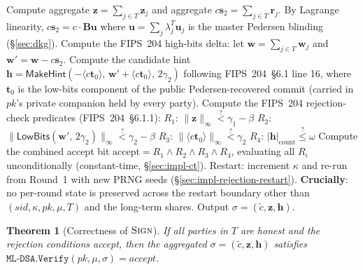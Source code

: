 \documentclass[11pt,a4paper]{article}
\newtheorem{theorem}{Theorem}
\theoremstyle{definition}
\theoremstyle{remark}
\newcommand{\LowBits}{\mathsf{LowBits}}
\newcommand{\MakeHint}{\mathsf{MakeHint}}
\newcommand{\Sign}{\textsc{Sign}}
\begin{document}
\begin{algorithm}[H]
\caption{$\Sign$ Aggregation and rejection (any honest party in $T$)}
\label{alg:sign-agg}
\begin{algorithmic}[1]
\State Compute aggregate $\mathbf{z} = \sum_{j \in T} \mathbf{z}_j$ and aggregate $c\mathbf{s}_2 = \sum_{j \in T} \mathbf{r}_j$. By Lagrange linearity, $c\mathbf{s}_2 = c \cdot \mathbf{B}\mathbf{u}$ where $\mathbf{u} = \sum_{j} \lambda_j^T \mathbf{u}_j$ is the master Pedersen blinding (\S\ref{sec:dkg}).
\State Compute the FIPS~204 high-bits delta: let $\mathbf{w} = \sum_{j \in T} \mathbf{w}_j$ and $\mathbf{w}' = \mathbf{w} - c\mathbf{s}_2$.
\State Compute the candidate hint $\mathbf{h} = \MakeHint(-\langle c\mathbf{t}_0 \rangle,\,\mathbf{w}' + \langle c\mathbf{t}_0 \rangle,\,2\gamma_2)$ following FIPS~204~\S6.1 line 16, where $\mathbf{t}_0$ is the low-bits component of the public Pedersen-recovered commit (carried in $\mathit{pk}$'s private companion held by every party).
\State Compute the FIPS~204 rejection-check predicates (FIPS~204~\S6.1.1):
\State \quad $R_1$: $\|\mathbf{z}\|_\infty \stackrel{?}{<} \gamma_1 - \beta$
\State \quad $R_2$: $\|\LowBits(\mathbf{w}',\,2\gamma_2)\|_\infty \stackrel{?}{<} \gamma_2 - \beta$
\State \quad $R_3$: $\|\langle c\mathbf{t}_0\rangle\|_\infty \stackrel{?}{<} \gamma_2$
\State \quad $R_4$: $|\mathbf{h}|_{\mathrm{count}} \stackrel{?}{\le} \omega$
\State Compute the combined accept bit $\mathrm{accept} = R_1 \wedge R_2 \wedge R_3 \wedge R_4$, evaluating all $R_i$ unconditionally (constant-time, \S\ref{sec:impl-ct}).
\State Restart: increment $\kappa$ and re-run from Round~1 with new PRNG seeds (\S\ref{sec:impl-rejection-restart}). \textbf{Crucially}: no per-round state is preserved across the restart boundary other than $(\mathit{sid}, \kappa, \mathit{pk}, \mu, T)$ and the long-term shares.
\Else
\State Output $\sigma = (\tilde c, \mathbf{z}, \mathbf{h})$.
\EndIf
\end{algorithmic}
\end{algorithm}

\begin{theorem}[Correctness of $\Sign$]
\label{thm:sign-correct}
If all parties in $T$ are honest and the rejection conditions
accept, then the aggregated $\sigma = (\tilde c, \mathbf{z}, \mathbf{h})$
satisfies $\texttt{ML-DSA.Verify}(\mathit{pk}, \mu, \sigma) = \mathit{accept}$.
\end{theorem}
\end{document}
